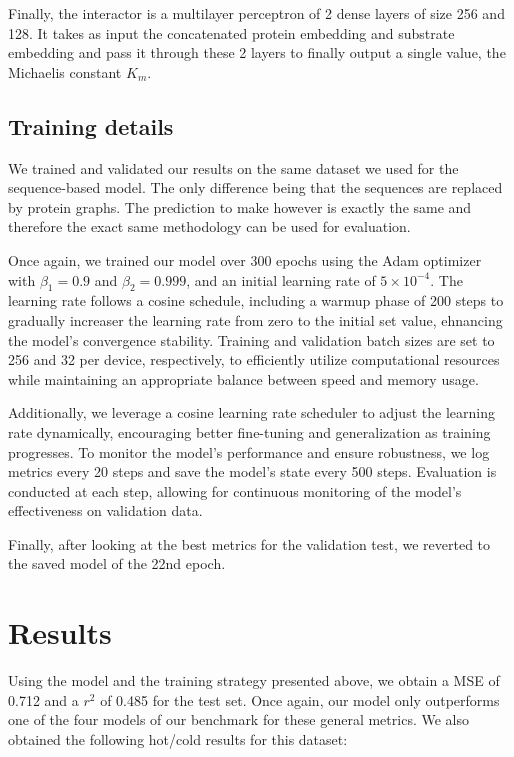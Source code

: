 Finally, the interactor is a multilayer perceptron of 2 dense layers of size 256 and 128. It takes as input the
concatenated protein embedding and substrate embedding and pass it through these 2 layers to finally output a single
value, the Michaelis constant $K_m$.

\subsection{Training details}

We trained and validated our results on the same dataset we used for the sequence-based model. The only difference
being that the sequences are replaced by protein graphs. The prediction to make however is exactly the same and 
therefore the exact same methodology can be used for evaluation.

Once again, we trained our model over 300 epochs using the Adam optimizer with $\beta_1=0.9$ and $\beta_2=0.999$, and an initial
learning rate of $5\times10^{-4}$. The learning rate follows a cosine schedule, including a warmup phase of 200
steps to gradually increaser the learning rate from zero to the initial set value, ehnancing the model's convergence
stability. Training and validation batch sizes are set to 256 and 32 per device, respectively, to efficiently
utilize computational resources while maintaining an appropriate balance between speed and memory usage. 

Additionally, we leverage a cosine learning rate scheduler to adjust the learning rate dynamically, 
encouraging better fine-tuning and generalization as training progresses. To monitor the model's performance 
and ensure robustness, we log metrics every 20 steps and save the model's state every 500 steps. 
Evaluation is conducted at each step, allowing for continuous monitoring of the model's effectiveness on 
validation data. 

Finally, after looking at the best metrics for the validation test, we reverted to the saved model of the 22nd epoch. 

\section{Results}

 Using the model and the training strategy presented above, we obtain a MSE of 0.712 and a $r^2$ of 0.485 for the test set. Once again, our model only outperforms one of the four models of our benchmark for these general metrics. We also obtained the following hot/cold results for this dataset:

